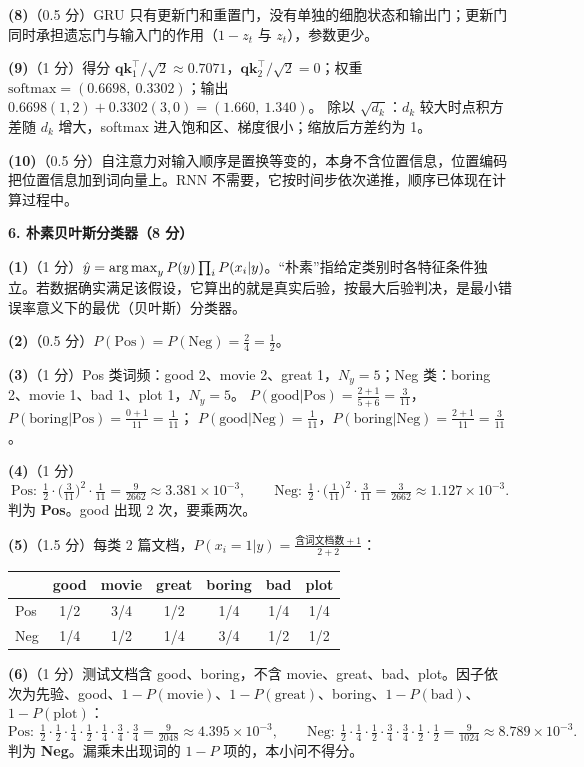 \textbf{(8)}（0.5 分）GRU 只有更新门和重置门，没有单独的细胞状态和输出门；更新门同时承担遗忘门与输入门的作用（$1-z_t$ 与 $z_t$），参数更少。

\textbf{(9)}（1 分）得分 $\bm q\bm k_1^\top/\sqrt2\approx0.7071$，$\bm q\bm k_2^\top/\sqrt2=0$；权重 $\mathrm{softmax}=(0.6698,\ 0.3302)$；输出 $0.6698(1,2)+0.3302(3,0)=(1.660,\ 1.340)$。
除以 $\sqrt{d_k}$：$d_k$ 较大时点积方差随 $d_k$ 增大，softmax 进入饱和区、梯度很小；缩放后方差约为 1。

\textbf{(10)}（0.5 分）自注意力对输入顺序是置换等变的，本身不含位置信息，位置编码把位置信息加到词向量上。RNN 不需要，它按时间步依次递推，顺序已体现在计算过程中。

\medskip
\noindent\textbf{6. 朴素贝叶斯分类器（8 分）}

\textbf{(1)}（1 分）$\hat y=\operatorname*{arg\,max}_y P(y)\prod_iP(x_i|y)$。“朴素”指给定类别时各特征条件独立。若数据确实满足该假设，它算出的就是真实后验，按最大后验判决，是最小错误率意义下的最优（贝叶斯）分类器。

\textbf{(2)}（0.5 分）$P(\text{Pos})=P(\text{Neg})=\frac24=\frac12$。

\textbf{(3)}（1 分）Pos 类词频：good 2、movie 2、great 1，$N_y=5$；Neg 类：boring 2、movie 1、bad 1、plot 1，$N_y=5$。
$P(\text{good}|\text{Pos})=\frac{2+1}{5+6}=\frac3{11}$，$P(\text{boring}|\text{Pos})=\frac{0+1}{11}=\frac1{11}$；
$P(\text{good}|\text{Neg})=\frac1{11}$，$P(\text{boring}|\text{Neg})=\frac{2+1}{11}=\frac3{11}$。

\textbf{(4)}（1 分）
\[
\text{Pos}:\ \tfrac12\cdot\big(\tfrac3{11}\big)^2\cdot\tfrac1{11}=\tfrac{9}{2662}\approx3.381\times10^{-3},\qquad
\text{Neg}:\ \tfrac12\cdot\big(\tfrac1{11}\big)^2\cdot\tfrac3{11}=\tfrac{3}{2662}\approx1.127\times10^{-3}.
\]
判为 \textbf{Pos}。good 出现 2 次，要乘两次。

\textbf{(5)}（1.5 分）每类 2 篇文档，$P(x_i=1|y)=\frac{\text{含词文档数}+1}{2+2}$：
\begin{center}
\begin{tabular}{lcccccc}
\toprule
 & good & movie & great & boring & bad & plot\\ \midrule
Pos & 1/2 & 3/4 & 1/2 & 1/4 & 1/4 & 1/4\\
Neg & 1/4 & 1/2 & 1/4 & 3/4 & 1/2 & 1/2\\
\bottomrule
\end{tabular}
\end{center}

\textbf{(6)}（1 分）测试文档含 good、boring，不含 movie、great、bad、plot。因子依次为先验、good、$1-P(\text{movie})$、$1-P(\text{great})$、boring、$1-P(\text{bad})$、$1-P(\text{plot})$：
\[
\text{Pos}:\ \tfrac12\cdot\tfrac12\cdot\tfrac14\cdot\tfrac12\cdot\tfrac14\cdot\tfrac34\cdot\tfrac34=\tfrac{9}{2048}\approx4.395\times10^{-3},\qquad
\text{Neg}:\ \tfrac12\cdot\tfrac14\cdot\tfrac12\cdot\tfrac34\cdot\tfrac34\cdot\tfrac12\cdot\tfrac12=\tfrac{9}{1024}\approx8.789\times10^{-3}.
\]
判为 \textbf{Neg}。漏乘未出现词的 $1-P$ 项的，本小问不得分。

